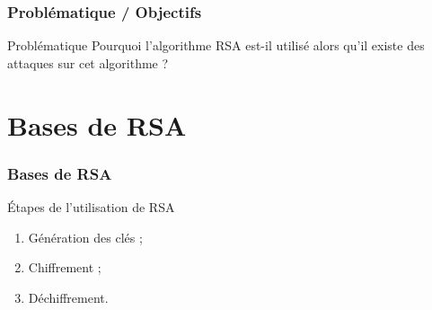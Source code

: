 \documentclass{beamer}
\begin{document}
    \begin{frame}
        \frametitle{Problématique / Objectifs}

        \begin{block}{Problématique}
            Pourquoi l'algorithme RSA est-il utilisé alors qu'il existe des attaques sur cet algorithme ?
        \end{block}

    \end{frame}

    \section{Bases de RSA}

    \begin{frame}
        \frametitle{Bases de RSA}

        \begin{block}{\'Etapes de l'utilisation de RSA}
            \begin{enumerate}
                \item Génération des clés ;
            
                \item<2-> Chiffrement ;
            
                \item<3-> Déchiffrement.
            \end{enumerate}
        \end{block}
    \end{frame}
\end{document}
